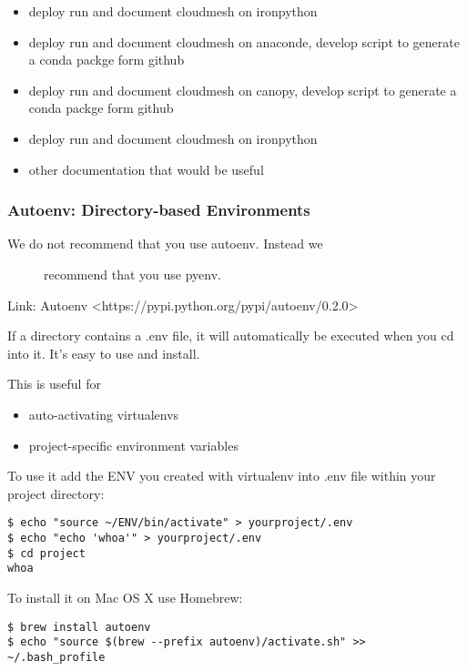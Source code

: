 \begin{itemize}
\tightlist
\item
  deploy run and document cloudmesh on ironpython
\item
  deploy run and document cloudmesh on anaconde, develop script to
  generate a conda packge form github
\item
  deploy run and document cloudmesh on canopy, develop script to
  generate a conda packge form github
\item
  deploy run and document cloudmesh on ironpython
\item
  other documentation that would be useful
\end{itemize}

\subsubsection{Autoenv: Directory-based
Environments}\label{autoenv-directory-based-environments}

\begin{description}
\item[We do not recommend that you use autoenv. Instead we]
recommend that you use pyenv.
\end{description}

Link:
Autoenv \textless{}https://pypi.python.org/pypi/autoenv/0.2.0\textgreater{}

If a directory contains a .env file, it will automatically be executed
when you cd into it. It's easy to use and install.

This is useful for

\begin{itemize}
\tightlist
\item
  auto-activating virtualenvs
\item
  project-specific environment variables
\end{itemize}

To use it add the ENV you created with virtualenv into .env file within
your project directory:

\begin{verbatim}
$ echo "source ~/ENV/bin/activate" > yourproject/.env
$ echo "echo 'whoa'" > yourproject/.env
$ cd project
whoa
\end{verbatim}

To install it on Mac OS X use Homebrew:

\begin{verbatim}
$ brew install autoenv
$ echo "source $(brew --prefix autoenv)/activate.sh" >> ~/.bash_profile
\end{verbatim}

